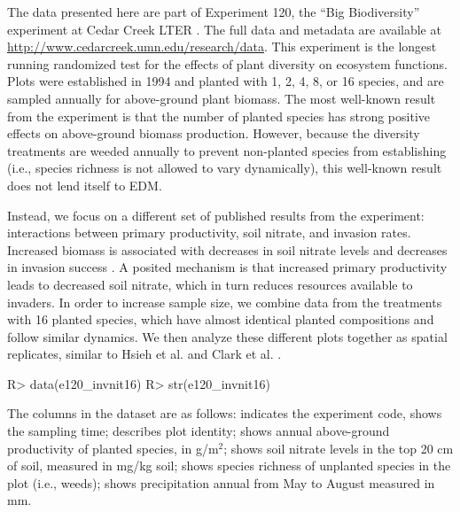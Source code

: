 \documentclass[article]{jss}
\begin{document}
The data presented here are part of Experiment 120, the ``Big Biodiversity'' experiment at Cedar Creek LTER \citep{Tilman_1997}. The full data and metadata are available at \url{http://www.cedarcreek.umn.edu/research/data}. This experiment is the longest running randomized test for the effects of plant diversity on ecosystem functions. Plots were established in 1994 and planted with 1, 2, 4, 8, or 16 species, and are sampled annually for above-ground plant biomass. The most well-known result from the experiment is that the number of planted species has strong positive effects on above-ground biomass production. However, because the diversity treatments are weeded annually to prevent non-planted species from establishing (i.e., species richness is not allowed to vary dynamically), this well-known result does not lend itself to EDM.

Instead, we focus on a different set of published results from the experiment: interactions between primary productivity, soil nitrate, and invasion rates. Increased biomass is associated with decreases in soil nitrate levels and decreases in invasion success \citep{Fargione_2005}. A posited mechanism is that increased primary productivity leads to decreased soil nitrate, which in turn reduces resources available to invaders. In order to increase sample size, we combine data from the treatments with 16 planted species, which have almost identical planted compositions and follow similar dynamics. We then analyze these different plots together as spatial replicates, similar to Hsieh et al. \citep{Hsieh_2008} and Clark et al. \citep{Clark_2015}.

\begin{Schunk}
\begin{Sinput}
R> data(e120_invnit16)
R> str(e120_invnit16)
\end{Sinput}
\end{Schunk}

The columns in the dataset  are as follows:  indicates the experiment code,  shows the sampling time;  describes plot identity;  shows annual above-ground productivity of planted species, in g/m$^2$;  shows soil nitrate levels in the top 20 cm of soil, measured in mg/kg soil;  shows species richness of unplanted species in the plot (i.e., weeds);  shows precipitation annual from May to August measured in mm.
\end{document}
